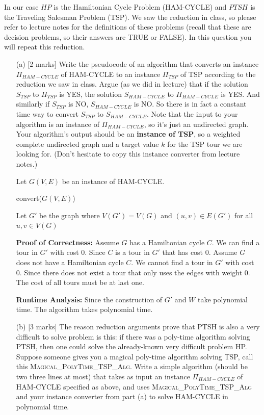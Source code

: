 \documentclass[11pt]{article}
\begin{document}
\begin{enumerate}
In our case $HP$ is the Hamiltonian Cycle Problem (HAM-CYCLE)  and $PTSH$ is the Traveling Salesman Problem (TSP). We saw the reduction in class, so please refer to lecture notes for the definitions of these problems (recall that these are decision problems, so their answers are TRUE or FALSE).  In this question you will repeat this reduction.

\begin{itemize}
\item[(a)] [2 marks] Write the pseudocode of an algorithm that converts an instance $\Pi_{HAM-CYCLE}$ of HAM-CYCLE to an instance $\Pi_{TSP}$ of TSP according to the reduction we saw in class. Argue (as we did in lecture) that if the solution $S_{TSP}$ to $\Pi_{TSP}$ is YES, the solution $S_{HAM-CYCLE}$ to $\Pi_{HAM-CYCLE}$ is YES. And similarly if $S_{TSP}$ is NO, $S_{HAM-CYCLE}$ is NO. So there is in fact a constant time way to convert $S_{TSP}$ to $S_{HAM-CYCLE}$.
Note that the input to your algorithm is an instance of $\Pi_{HAM-CYCLE}$, so it's just an undirected graph.
Your algorithm's output should be an {\bf instance of TSP}, so a weighted complete undirected graph and a target value $k$ for the TSP tour we are looking for. (Don't hesitate to copy this instance converter from lecture notes.)

Let $G(V, E)$ be an instance of HAM-CYCLE.
\begin{algorithm}[h]
    \caption{convert($G(V, E)$)}
    Let $G'$ be the graph where $V(G') = V(G)$ and $(u, v) \in E(G')$ for all $u, v \in V(G)$\\
\end{algorithm}

\textbf{Proof of Correctness:} Assume $G$ has a Hamiltonian cycle $C$. We can find a tour in $G'$ with cost 0.
Since $C$ is a tour in $G'$ that has cost 0. Assume $G$ does not have a Hamiltonian cycle $C$. 
We cannot find a tour in $G'$ with cost 0. Since there does not exist a tour that only uses the edges with 
weight 0. The cost of all tours must be at last one. 

\textbf{Runtime Analysis:} Since the construction of $G'$ and $W$ take polynomial time. The algorithm takes 
polynomial time.
\newpage
\item[(b)] [3 marks] The reason reduction arguments prove that PTSH is also a very difficult to solve problem is this: if there was a poly-time algorithm solving PTSH, then one could solve the already-known very difficult problem HP. Suppose someone gives you a magical poly-time algorithm solving TSP, call this \textsc{Magical\_PolyTime\_TSP\_Alg}. Write a simple algorithm (should be two three lines at most) that takes as input an instance $\Pi_{HAM-CYCLE}$ of HAM-CYCLE specified as above, and uses \textsc{Magical\_PolyTime\_TSP\_Alg} and your instance converter from part (a) to solve HAM-CYCLE in polynomial time.


\end{itemize}
\end{enumerate}
\end{document}
